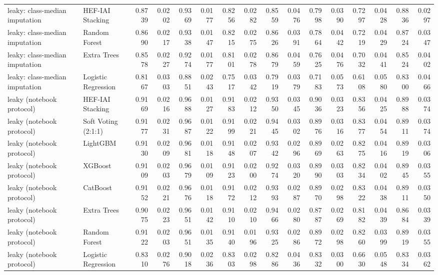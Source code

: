 \begin{tabular}{llrrrrrrrrrrrrrr}
leaky: class-median imputation & HEF-IAI Stacking & 0.8739 & 0.0202 & 0.9369 & 0.0177 & 0.8256 & 0.0282 & 0.8559 & 0.0476 & 0.7998 & 0.0390 & 0.7297 & 0.0428 & 0.8836 & 0.0297 \\
leaky: class-median imputation & Random Forest & 0.8690 & 0.0217 & 0.9338 & 0.0147 & 0.8215 & 0.0275 & 0.8626 & 0.0391 & 0.7864 & 0.0442 & 0.7219 & 0.0429 & 0.8724 & 0.0347 \\
leaky: class-median imputation & Extra Trees & 0.8578 & 0.0227 & 0.9274 & 0.0177 & 0.8101 & 0.0278 & 0.8679 & 0.0459 & 0.7625 & 0.0476 & 0.7032 & 0.0441 & 0.8524 & 0.0402 \\
leaky: class-median imputation & Logistic Regression & 0.8167 & 0.0303 & 0.8851 & 0.0243 & 0.7517 & 0.0342 & 0.7919 & 0.0379 & 0.7183 & 0.0573 & 0.6108 & 0.0580 & 0.8300 & 0.0466 \\
leaky (notebook protocol) & HEF-IAI Stacking & 0.9169 & 0.0216 & 0.9688 & 0.0127 & 0.9183 & 0.0212 & 0.9350 & 0.0345 & 0.9036 & 0.0323 & 0.8356 & 0.0425 & 0.8988 & 0.0374 \\
leaky (notebook protocol) & Soft Voting (2:1:1) & 0.9177 & 0.0231 & 0.9687 & 0.0122 & 0.9199 & 0.0221 & 0.9445 & 0.0302 & 0.8976 & 0.0316 & 0.8377 & 0.0454 & 0.8911 & 0.0374 \\
leaky (notebook protocol) & LightGBM & 0.9130 & 0.0209 & 0.9681 & 0.0118 & 0.9148 & 0.0207 & 0.9342 & 0.0296 & 0.8969 & 0.0263 & 0.8275 & 0.0416 & 0.8919 & 0.0306 \\
leaky (notebook protocol) & XGBoost & 0.9109 & 0.0203 & 0.9679 & 0.0109 & 0.9123 & 0.0200 & 0.9274 & 0.0320 & 0.8990 & 0.0303 & 0.8234 & 0.0402 & 0.8945 & 0.0355 \\
leaky (notebook protocol) & CatBoost & 0.9152 & 0.0221 & 0.9676 & 0.0118 & 0.9172 & 0.0212 & 0.9393 & 0.0287 & 0.8970 & 0.0298 & 0.8322 & 0.0438 & 0.8911 & 0.0350 \\
leaky (notebook protocol) & Extra Trees & 0.9075 & 0.0223 & 0.9651 & 0.0142 & 0.9110 & 0.0210 & 0.9466 & 0.0280 & 0.8787 & 0.0269 & 0.8182 & 0.0439 & 0.8684 & 0.0339 \\
leaky (notebook protocol) & Random Forest & 0.9122 & 0.0203 & 0.9651 & 0.0135 & 0.9140 & 0.0196 & 0.9325 & 0.0286 & 0.8972 & 0.0298 & 0.8260 & 0.0399 & 0.8919 & 0.0355 \\
leaky (notebook protocol) & Logistic Regression & 0.8310 & 0.0276 & 0.9018 & 0.0236 & 0.8303 & 0.0298 & 0.8286 & 0.0436 & 0.8332 & 0.0300 & 0.6630 & 0.0548 & 0.8334 & 0.0362 \\
\bottomrule
\end{tabular}
